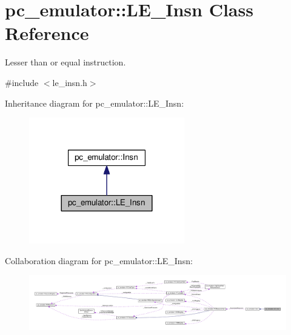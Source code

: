 \hypertarget{classpc__emulator_1_1LE__Insn}{}\section{pc\+\_\+emulator\+:\+:L\+E\+\_\+\+Insn Class Reference}
\label{classpc__emulator_1_1LE__Insn}


Lesser than or equal instruction.  




{\ttfamily \#include $<$le\+\_\+insn.\+h$>$}



Inheritance diagram for pc\+\_\+emulator\+:\+:L\+E\+\_\+\+Insn\+:\nopagebreak
\begin{figure}[H]
\begin{center}
\leavevmode
\includegraphics[width=192pt]{classpc__emulator_1_1LE__Insn__inherit__graph}
\end{center}
\end{figure}


Collaboration diagram for pc\+\_\+emulator\+:\+:L\+E\+\_\+\+Insn\+:\nopagebreak
\begin{figure}[H]
\begin{center}
\leavevmode
\includegraphics[width=350pt]{classpc__emulator_1_1LE__Insn__coll__graph}
\end{center}
\end{figure}
